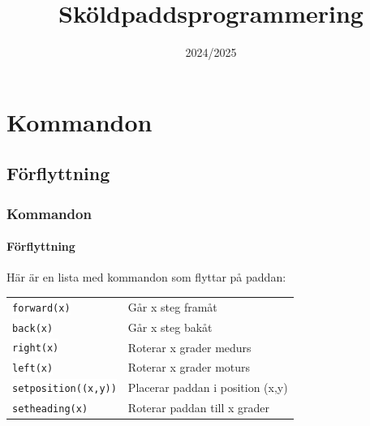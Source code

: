 \documentclass[aspectratio=169]{beamer}
\newcommand{\code}[1]{\colorbox{white}{\lstinline{#1}}}
\begin{document}


\title{Sköldpaddsprogrammering}
\date{2024/2025}

\maketitle

\section{Kommandon}

\subsection{Förflyttning}

\begin{frame}
	\frametitle{Kommandon}
	\framesubtitle{Förflyttning}
	
	Här är en lista med kommandon som flyttar på paddan:
	
	\begin{tabular}{ll}
		\code{forward(x)} & Går x steg framåt\\
		\code{back(x)} & Går x steg bakåt\\
		\code{right(x)} & Roterar x grader medurs\\
		\code{left(x)} & Roterar x grader moturs\\
		\code{setposition((x,y))} & Placerar paddan i position (x,y)\\
		\code{setheading(x)} & Roterar paddan till x grader
	\end{tabular}
	
\end{frame}
\end{document}
